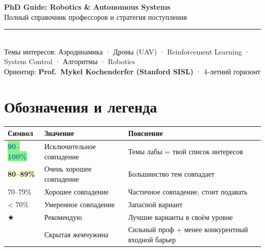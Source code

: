 \documentclass[10pt, a4paper]{article}
\begin{document}

\begin{center}
{\color{navy}\LARGE\bfseries PhD Guide: Robotics \& Autonomous Systems}\\[6pt]
{\color{steelblue}\large Полный справочник профессоров и стратегия поступления}\\[4pt]
{\color{navy}\rule{\linewidth}{2pt}}\\[4pt]
{\small\color{darkgray}
Темы интересов: Аэродинамика · Дроны (UAV) · Reinforcement Learning ·
System Control · Алгоритмы · Robotics \\
Ориентир: \textbf{Prof.\ Mykel Kochenderfer (Stanford SISL)} · 4-летний горизонт
}
\end{center}

\vspace{6pt}
\tableofcontents
\newpage

\section{Обозначения и легенда}

\begin{tabular}{lll}
\toprule
\textbf{Символ} & \textbf{Значение} & \textbf{Пояснение} \\
\midrule
\colorbox{lightgreen}{\textcolor{teal}{\textbf{90–100\%}}} & Исключительное совпадение &
  Темы лабы = твой список интересов \\
\colorbox{lightyellow}{\textcolor{amber}{\textbf{80–89\%}}} & Очень хорошее совпадение &
  Большинство тем совпадает \\
\colorbox{lightorange}{\textcolor{amber}{70–79\%}} & Хорошее совпадение &
  Частичное совпадение, стоит подавать \\
\colorbox{lightred}{\textcolor{red!70!black}{< 70\%}} & Умеренное совпадение &
  Запасной вариант \\
\colorbox{lightstar}{\textcolor{amber}{★}} & Рекомендую & Лучшие варианты в своём уровне \\
\colorbox{lightgem}{\textcolor{teal}{💎}} & Скрытая жемчужина &
  Сильный проф + менее конкурентный входной барьер \\
\bottomrule
\end{tabular}
\end{document}
